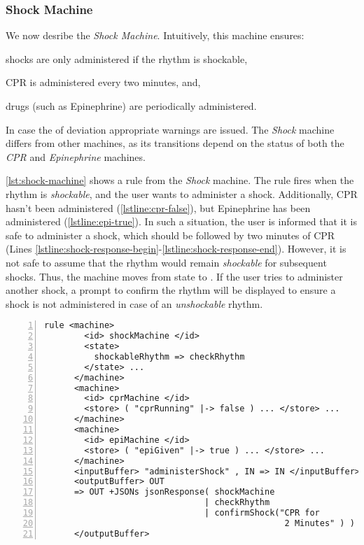 \subsubsection{Shock Machine}

We now desribe the \textit{Shock Machine}. Intuitively, this
machine ensures:
\begin{enumerate*}[label=(\alph*)]
  \item shocks are only administered if the rhythm is shockable,
  \item CPR is administered every two minutes, and,
  \item drugs (such as Epinephrine) are periodically administered.
\end{enumerate*}
In case the of deviation appropriate warnings are issued. The \textit{Shock}
machine differs from other machines, as its transitions depend
on the status of both the \textit{CPR} and \textit{Epinephrine} machines.

\autoref{lst:shock-machine} shows a rule from the \textit{Shock} machine.
The rule fires when the rhythm is \textit{shockable}, and the user
wants to administer a shock. Additionally, CPR hasn't been administered
(\autoref{lstline:cpr-false}), but
Epinephrine has been administered (\autoref{lstline:epi-true}).
In such a situation, the user is informed that it is safe to
administer a shock, which should be followed by
two minutes of CPR (Lines
\ref{lstline:shock-response-begin}-\ref{lstline:shock-response-end}).
However, it is not safe to assume that the rhythm would remain
\textit{shockable} for subsequent shocks. Thus, the machine moves from
state  to . If the
user tries to administer another shock, a prompt to confirm the rhythm will be
displayed to ensure a shock is not administered in case of an \emph{unshockable}
rhythm.

\begin{lstlisting}[float=ht,
  frame=single,
  style=ksty,
  language=k,
  numbers=left,
  numbersep=5pt,
  caption={Shock Machine in $\K$},
  label={lst:shock-machine},
  xleftmargin=3ex
]
rule <machine>
        <id> shockMachine </id>
        <state>
          shockableRhythm => checkRhythm                         @\label{lstline:shock-state}@
        </state> ...
      </machine>
      <machine>
        <id> cprMachine </id>
        <store> ( "cprRunning" |-> false ) ... </store> ...      @\label{lstline:cpr-false}@
      </machine>
      <machine>
        <id> epiMachine </id>
        <store> ( "epiGiven" |-> true ) ... </store> ...        @\label{lstline:epi-true}@
      </machine>
      <inputBuffer> "administerShock" , IN => IN </inputBuffer>
      <outputBuffer> OUT                                        @\label{lstline:shock-response-begin}@
      => OUT +JSONs jsonResponse( shockMachine
                                | checkRhythm
                                | confirmShock("CPR for
                                                2 Minutes" ) )  @\label{lstline:shock-response-end}@
      </outputBuffer>
\end{lstlisting}


